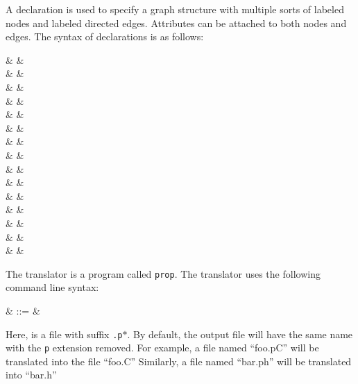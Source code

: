 A  declaration is used to specify a
graph structure 
with multiple sorts of labeled nodes and labeled directed edges.  
Attributes can be attached to both nodes and edges.  
The syntax of  declarations is as follows:
\begin{syntax}
      & \IS &  \Id \\
      & & \quad {} \\
      & & \quad {} \\
      & &  \\
      & & \quad {}  \\
      & & \quad {}  \\
      & &  \\
      & & \quad {} \\
      & &   \T{;} \\
 & \IS & \\
 & \IS & \Id {} \\
    & \IS & \Id {} \TypeExp \T{->} \TypeExp \\
    & \OR & \Id {} \TypeExp \T{<->} \TypeExp \\
    & \OR & \Id {} \TypeExp \T{<=>} \TypeExp \\
    & \OR & \Id {} \TypeExp \T{<=>*} \TypeExp \\
\end{syntax}

 \label{sec:graph-interface}
\INCOMPLETE

 \label{sec:set-formalisms}
\INCOMPLETE

 \label{sec:graph-rewriting}
\INCOMPLETE

 \label{sec:usage} 

The \Prop{} translator is a program called \verb|prop|.  The translator
uses the following command line syntax:
\begin{syntax}
   & ::= &
      \\
\end{syntax}

Here,  is a file with suffix \verb|.p|$*$.  By default, the output
file will have the same name with the \verb|p| extension removed.
For example, a file named ``foo.pC'' will be translated into
the file ``foo.C''  Similarly, a file named ``bar.ph'' will be translated 
into ``bar.h''  

